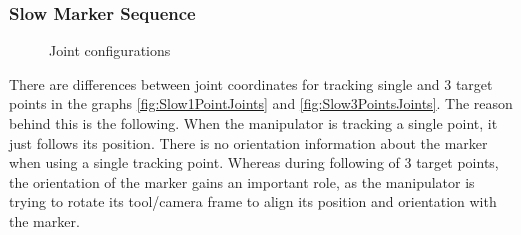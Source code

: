 \documentclass[]{scrartcl}
\begin{document}
\subsubsection*{Slow Marker Sequence}
\begin{figure}[!htp]
	\hfill
	\caption{Joint configurations}
	\label{fig:SlowSequenceJoints}
\end{figure}
There are differences between joint coordinates for tracking single and 3 target points in the graphs \ref{fig:Slow1PointJoints} and \ref{fig:Slow3PointsJoints}. The reason behind this is the following. When the manipulator is tracking a single point, it just follows its position. There is no orientation information about the marker when using a single tracking point. Whereas during following of 3 target points, the orientation of the marker gains an important role, as the manipulator is trying to rotate its tool/camera frame to align its position and orientation with the marker. 
\end{document}
